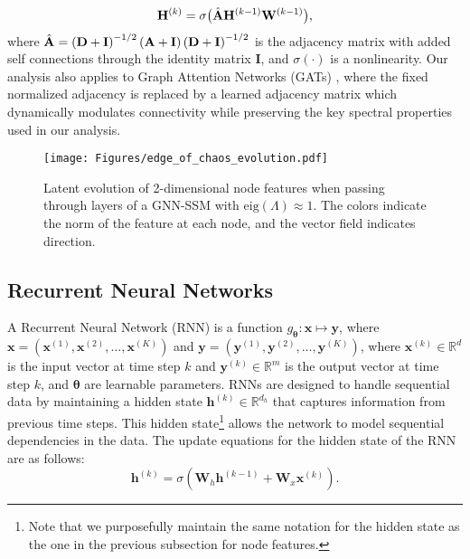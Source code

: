 \begin{equation}
\mathbf{H}^{(k)}=\sigma\big(\Hat{\mathbf{A}}\mathbf{H}^{(k-1)}\mathbf{W}^{(k-1)}\big),
    \label{eq:gcn}
\end{equation}
where $\Hat{\mathbf{A}}=\left(\mathbf{D}+\mathbf{I}\right)^{-1/2} \left(\mathbf{A} + \mathbf{I}\right)\left(\mathbf{D}+\mathbf{I}\right)^{-1/2}$ is the adjacency matrix with added self connections through the identity matrix $\mathbf{I}$, and $\sigma(\cdot)$ is a nonlinearity. Our analysis also applies to Graph Attention Networks (GATs) \cite{Velickovic2018GraphAN}, where the fixed normalized adjacency is replaced by a learned adjacency matrix which dynamically modulates connectivity while preserving the key spectral properties used in our analysis.


\begin{figure}
	\centering
       \texttt{[image: Figures/edge\_of\_chaos\_evolution.pdf]}
       \caption{Latent evolution of 2-dimensional node features when passing through layers of a GNN-SSM with $\text{eig}(\Lambda)\approx 1$. The colors indicate the norm of the feature at each node, and the vector field indicates direction. }
       \label{fig:illustration}
       \vspace{-0.4cm}
\end{figure}
\vspace{-0.2cm}

\subsection{Recurrent Neural Networks}



A Recurrent Neural Network (RNN) is a function $g_{\boldsymbol{\theta}}: \mathbf{x} \mapsto \mathbf{y}$, where  $\mathbf{x} = (\mathbf{x}^{(1)}, \mathbf{x}^{(2)}, \ldots, \mathbf{x}^{(K)})$ and $\mathbf{y} = (\mathbf{y}^{(1)}, \mathbf{y}^{(2)}, \ldots, \mathbf{y}^{(K)})$, where $\mathbf{x}^{(k)} \in \mathbb{R}^d$ is the input vector at time step $k$ and $\mathbf{y}^{(k)} \in \mathbb{R}^m$ is the output vector at time step $k$, and $\boldsymbol{\theta}$ are learnable parameters. RNNs are designed to handle sequential data by maintaining a hidden state $\mathbf{h}^{(k)}\in\mathbb{R}^{d_h}$ that captures information from previous time steps. This hidden state\footnote{Note that we purposefully maintain the same notation for the hidden state as the one in the previous subsection for node features.} allows the network to model sequential dependencies in the data. The update equations for the hidden state of the RNN are as follows:
\begin{equation}
    \mathbf{h}^{(k)} = \sigma(\mathbf{W}_h \mathbf{h}^{(k-1)} + \mathbf{W}_x \mathbf{x}^{(k)}).
    \label{eq:rnn}
\end{equation}

